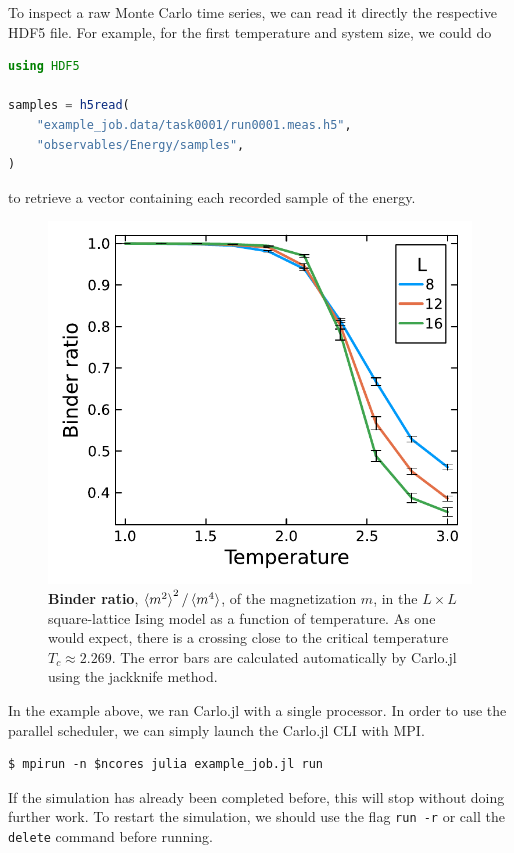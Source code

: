 \documentclass{SciPost}
\begin{document}
To inspect a raw Monte Carlo time series, we can read it directly the respective HDF5 file. For example, for the first temperature and system size, we could do
\begin{lstlisting}[language=julia]
using HDF5

samples = h5read(
    "example_job.data/task0001/run0001.meas.h5",
    "observables/Energy/samples",
)
\end{lstlisting}
to retrieve a vector containing each recorded sample of the energy.
\begin{figure}
\begin{center}
\includegraphics[scale=0.6]{figs/binder_ratio.pdf}
\end{center}
\caption{\textbf{Binder ratio}, $\braket{m^2}^2/\braket{m^4}$, of the magnetization $m$, in the $L\times L$ square-lattice Ising model as a function of temperature. As one would expect, there is a crossing close to the critical temperature $T_c \approx 2.269$. The error bars are calculated automatically by Carlo.jl using the jackknife method.}
\label{fig:binder}
\end{figure}

In the example above, we ran Carlo.jl with a single processor. In order to use the parallel scheduler, we can simply launch the Carlo.jl CLI with MPI.
\begin{lstlisting}
$ mpirun -n $ncores julia example_job.jl run
\end{lstlisting}
If the simulation has already been completed before, this will stop without doing further work. To restart the simulation, we should use the flag \texttt{run -r} or call the \texttt{delete} command before running.
\end{document}
